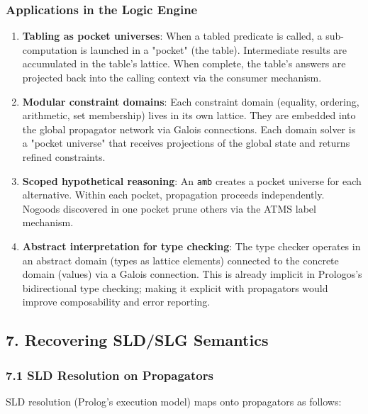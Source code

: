 \documentclass[11pt]{article}
\begin{document}
\subsubsection{Applications in the Logic Engine}
\label{sec:org921bab0}

\begin{enumerate}
\item \textbf{Tabling as pocket universes}: When a tabled predicate is called, a
sub-computation is launched in a "pocket" (the table). Intermediate
results are accumulated in the table's lattice. When complete, the
table's answers are projected back into the calling context via the
consumer mechanism.

\item \textbf{Modular constraint domains}: Each constraint domain (equality,
ordering, arithmetic, set membership) lives in its own lattice. They
are embedded into the global propagator network via Galois connections.
Each domain solver is a "pocket universe" that receives projections of
the global state and returns refined constraints.

\item \textbf{Scoped hypothetical reasoning}: An \texttt{amb} creates a pocket universe
for each alternative. Within each pocket, propagation proceeds
independently. Nogoods discovered in one pocket prune others via
the ATMS label mechanism.

\item \textbf{Abstract interpretation for type checking}: The type checker operates
in an abstract domain (types as lattice elements) connected to the
concrete domain (values) via a Galois connection. This is already
implicit in Prologos's bidirectional type checking; making it explicit
with propagators would improve composability and error reporting.
\end{enumerate}
\subsection{7. Recovering SLD/SLG Semantics}
\label{sec:orgece61ff}

\subsubsection{7.1 SLD Resolution on Propagators}
\label{sec:orgc9dd85a}

SLD resolution (Prolog's execution model) maps onto propagators as follows:
\end{document}
